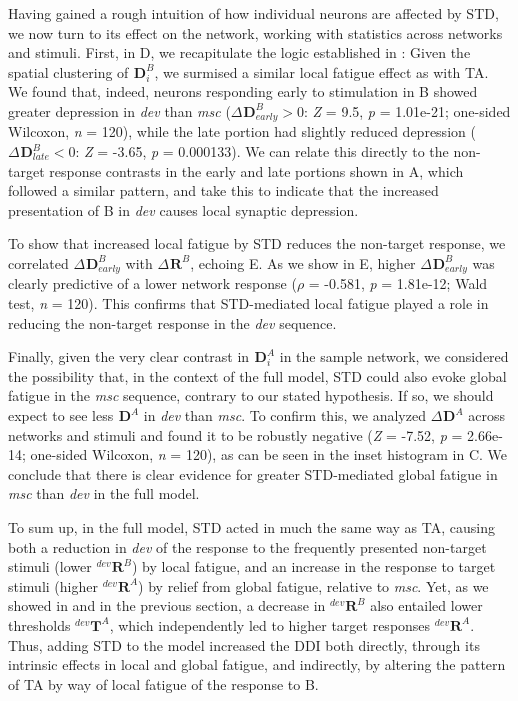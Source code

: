 \documentclass[9pt,lineno,onehalfspacing]{elife}
\newcommand{\dev}{\textit{dev}}
\newcommand{\msc}{\textit{msc}}
\newcommand{\R}[3][]{{}^{#1}_{}\boldsymbol R^{#2}_{#3}}
\newcommand{\T}[3][]{{}^{#1}_{}\boldsymbol T^{#2}_{#3}}
\newcommand{\D}[3][]{{}^{#1}_{}\boldsymbol D^{#2}_{#3}}
\begin{document}
Having gained a rough intuition of how individual neurons are affected by STD, we now turn to its effect on the network, working with statistics across networks and stimuli. First, in D, we recapitulate the logic established in : Given the spatial clustering of $\D{B}{i}$, we surmised a similar local fatigue effect as with TA. We found that, indeed, neurons responding early to stimulation in B showed greater depression in \dev{} than \msc{} ($\Delta \D{B}{early} > 0$: \textit{Z} = 9.5, \textit{p} = 1.01e-21; one-sided Wilcoxon, \textit{n} = 120), while the late portion had slightly reduced depression ($\Delta \D{B}{late} < 0$: \textit{Z} = -3.65, \textit{p} = 0.000133). We can relate this directly to the non-target response contrasts in the early and late portions shown in A, which followed a similar pattern, and take this to indicate that the increased presentation of B in \dev{} causes local synaptic depression. %

To show that increased local fatigue by STD reduces the non-target response, we correlated $\Delta \D{B}{early}$ with $\Delta \R{B}{}$, echoing E. As we show in E, higher $\Delta \D{B}{early}$ was clearly predictive of a lower network response ($\rho$ = -0.581, \textit{p} = 1.81e-12; Wald test, \textit{n} = 120). This confirms that STD-mediated local fatigue played a role in reducing the non-target response in the \dev{} sequence.

Finally, given the very clear contrast in $\D{A}{i}$ in the sample network, we considered the possibility that, in the context of the full model, STD could also evoke global fatigue in the \msc{} sequence, contrary to our stated hypothesis. If so, we should expect to see less $\D{A}{}$ in \dev{} than \msc{}. To confirm this, we analyzed $\Delta \D{A}{}$ across networks and stimuli and found it to be robustly negative (\textit{Z} = -7.52, \textit{p} = 2.66e-14; one-sided Wilcoxon, \textit{n} = 120), as can be seen in the inset histogram in C. We conclude that there is clear evidence for greater STD-mediated global fatigue in \msc{} than \dev{} in the full model.

To sum up, in the full model, STD acted in much the same way as TA, causing both a reduction in \dev{} of the response to the frequently presented non-target stimuli (lower $\R[dev]{B}{}$) by local fatigue, and an increase in the response to target stimuli (higher $\R[dev]{A}{}$) by relief from global fatigue, relative to \msc{}. Yet, as we showed in  and in the previous section, a decrease in $\R[dev]{B}{}$ also entailed lower thresholds $\T[dev]{A}{}$, which independently led to higher target responses $\R[dev]{A}{}$. Thus, adding STD to the model increased the DDI both directly, through its intrinsic effects in local and global fatigue, and indirectly, by altering the pattern of TA by way of local fatigue of the response to B.
\end{document}
